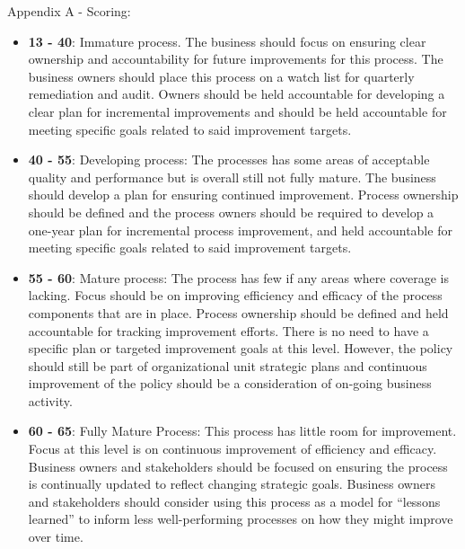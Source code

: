 \documentclass[unknownkeysallowed]{beamer}
\begin{document}
\begin{frame}[label={sec:org2cee68d}]{Appendix A - Scoring:}
\scriptsize
\begin{itemize}
\item \textbf{13 - 40}: Immature process. The business should focus on ensuring clear ownership and accountability for future improvements for this process. The business owners should place this process on a watch list for quarterly remediation and audit. Owners should be held accountable for developing a clear plan for incremental improvements and should be held accountable for meeting specific goals related to said improvement targets.

\item \textbf{40 - 55}: Developing process: The processes has some areas of acceptable quality and performance but is overall still not fully mature. The business should develop a plan for ensuring continued improvement. Process ownership should be defined and the process owners should be required to develop a one-year plan for incremental process improvement, and held accountable for meeting specific goals related to said improvement targets.

\item \textbf{55 - 60}: Mature process: The process has few if any areas where coverage is lacking. Focus should be on improving efficiency and efficacy of the process components that are in place. Process ownership should be defined and held accountable for tracking improvement efforts. There is no need to have a specific plan or targeted improvement goals at this level. However, the policy should still be part of organizational unit strategic plans and continuous improvement of the policy should be a consideration of on-going business activity.

\item \textbf{60 - 65}: Fully Mature Process: This process has little room for improvement. Focus at this level is on continuous improvement of efficiency and efficacy. Business owners and stakeholders should be focused on ensuring the process is continually updated to reflect changing strategic goals. Business owners and stakeholders should consider using this process as a model for ``lessons learned'' to inform less well-performing processes on how they might improve over time.
\end{itemize}
\end{frame}
\end{document}
